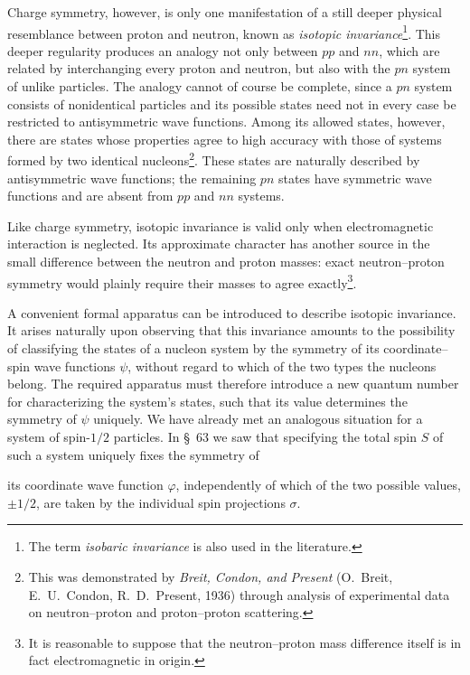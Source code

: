 Charge symmetry, however, is only one manifestation of a still deeper physical resemblance between proton and neutron, known as \emph{isotopic invariance}\footnote{The term \emph{isobaric invariance} is also used in the literature.}. This deeper regularity produces an analogy not only between $pp$ and $nn$, which are related by interchanging every proton and neutron, but also with the $pn$ system of unlike particles. The analogy cannot of course be complete, since a $pn$ system consists of nonidentical particles and its possible states need not in every case be restricted to antisymmetric wave functions. Among its allowed states, however, there are states whose properties agree to high accuracy with those of systems formed by two identical nucleons\footnote{This was demonstrated by \emph{Breit, Condon, and Present} (O.~Breit, E.~U.~Condon, R.~D.~Present, 1936) through analysis of experimental data on neutron--proton and proton--proton scattering.}. These states are naturally described by antisymmetric wave functions; the remaining $pn$ states have symmetric wave functions and are absent from $pp$ and $nn$ systems.

Like charge symmetry, isotopic invariance is valid only when electromagnetic interaction is neglected. Its approximate character has another source in the small difference between the neutron and proton masses: exact neutron--proton symmetry would plainly require their masses to agree exactly\footnote{It is reasonable to suppose that the neutron--proton mass difference itself is in fact electromagnetic in origin.}.

A convenient formal apparatus can be introduced to describe isotopic invariance. It arises naturally upon observing that this invariance amounts to the possibility of classifying the states of a nucleon system by the symmetry of its coordinate--spin wave functions $\psi$, without regard to which of the two types the nucleons belong. The required apparatus must therefore introduce a new quantum number for characterizing the system's states, such that its value determines the symmetry of $\psi$ uniquely. We have already met an analogous situation for a system of spin-$1/2$ particles. In \S~63 we saw that specifying the total spin $S$ of such a system uniquely fixes the symmetry of

its coordinate wave function $\varphi$, independently of which of the two possible values, $\pm1/2$, are taken by the individual spin projections $\sigma$.

